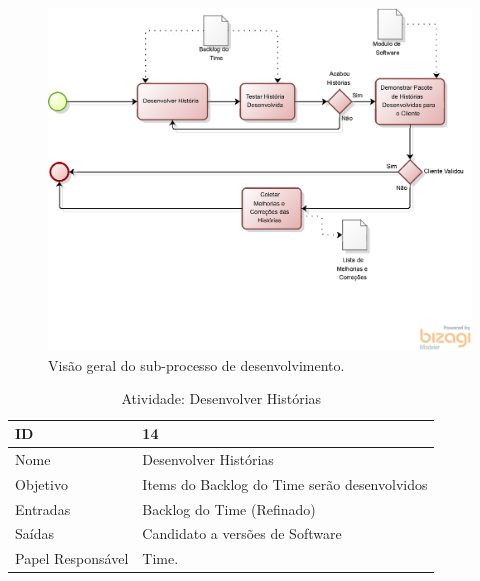     \begin{figure}[H]
        \centering
      \includegraphics[keepaspectratio=true,scale=0.6]{figuras/desenvolves.eps}
        \caption{Visão geral do sub-processo de desenvolvimento.}
        \label{fig:gerencia}
    \end{figure}


    \begin{table}[H]
      \centering
        \begin{tabular}{| m{5em} | m{10cm} |}
          \hline
          ID       & 14   \\ \hline
          Nome     & Desenvolver Histórias  \\ \hline
          Objetivo & Items do Backlog do Time serão desenvolvidos  \\ \hline
          Entradas & Backlog do Time (Refinado)\\ \hline
          Saídas   & Candidato a versões de Software \\ \hline
          Papel Responsável   & Time. \\ \hline
        \end{tabular}
        \caption{Atividade: Desenvolver Histórias}
        \label{tabela:atividade14}
    \end{table}

